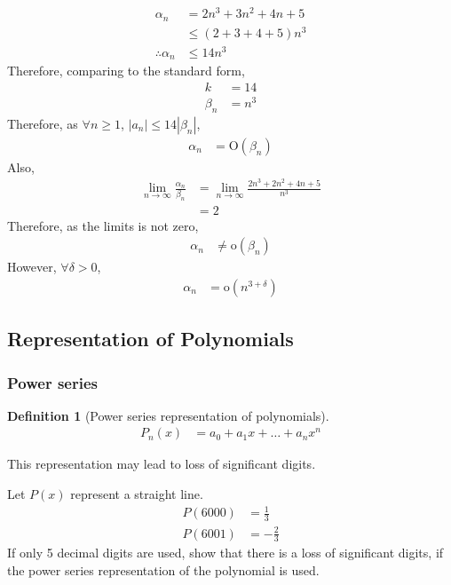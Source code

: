 \documentclass[fleqn, a4paper, 12pt, twoside]{article}
\theoremstyle{definition}
\newtheorem{definition}{Definition}
\theoremstyle{theorem}
\begin{document}
\begin{solution}
	\begin{align*}
		\alpha_n &= 2 n^3 + 3 n^2 + 4 n + 5\\
		&\le (2 + 3 + 4 + 5) n^3\\
		\therefore \alpha_n &\le 14 n^3
	\end{align*}
	Therefore, comparing to the standard form,
	\begin{align*}
		k &= 14\\
		\beta_n &= n^3
	\end{align*}
	Therefore, as $\forall n \ge 1$, $|a_n| \le 14 |\beta_n|$,
	\begin{align*}
		\alpha_n &= \mathrm{O}(\beta_n)
	\end{align*}
	Also,
	\begin{align*}
		\lim\limits_{n \to \infty} \frac{\alpha_n}{\beta_n} &= \lim\limits_{n \to \infty} \frac{2 n^3 + 2 n^2 + 4 n + 5}{n^3}\\
		&= 2
	\end{align*}
	Therefore, as the limits is not zero,
	\begin{align*}
		\alpha_n &\neq \mathrm{o}(\beta_n)
	\end{align*}
	However, $\forall \delta > 0$,
	\begin{align*}
		\alpha_n &= \mathrm{o}\left( n^{3 + \delta} \right)
	\end{align*}
\end{solution}

\subsection{Representation of Polynomials}

\subsubsection{Power series}	

\begin{definition}[Power series representation of polynomials]
	\begin{align*}
		P_n(x) &= a_0 + a_1 x + \dots + a_n x^n
	\end{align*}
\end{definition}

This representation may lead to loss of significant digits.

\begin{question}
	Let $P(x)$ represent a straight line.
	\begin{align*}
		P(6000) &= \frac{1}{3}\\
		P(6001) &= -\frac{2}{3}
	\end{align*}
	If only 5 decimal digits are used, show that there is a loss of significant digits, if the power series representation of the polynomial is used.
\end{question}
\end{document}
